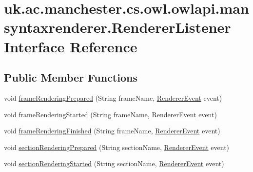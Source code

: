 \hypertarget{interfaceuk_1_1ac_1_1manchester_1_1cs_1_1owl_1_1owlapi_1_1mansyntaxrenderer_1_1_renderer_listener}{\section{uk.\-ac.\-manchester.\-cs.\-owl.\-owlapi.\-mansyntaxrenderer.\-Renderer\-Listener Interface Reference}
\label{interfaceuk_1_1ac_1_1manchester_1_1cs_1_1owl_1_1owlapi_1_1mansyntaxrenderer_1_1_renderer_listener}
}
\subsection*{Public Member Functions}
\begin{DoxyCompactItemize}
\item 
void \hyperlink{interfaceuk_1_1ac_1_1manchester_1_1cs_1_1owl_1_1owlapi_1_1mansyntaxrenderer_1_1_renderer_listener_a1dfb617b0ed1c2310d50a1e9f17dc08f}{frame\-Rendering\-Prepared} (String frame\-Name, \hyperlink{classuk_1_1ac_1_1manchester_1_1cs_1_1owl_1_1owlapi_1_1mansyntaxrenderer_1_1_renderer_event}{Renderer\-Event} event)
\item 
void \hyperlink{interfaceuk_1_1ac_1_1manchester_1_1cs_1_1owl_1_1owlapi_1_1mansyntaxrenderer_1_1_renderer_listener_a4698bfbea7fed76af497126dbd8f71cd}{frame\-Rendering\-Started} (String frame\-Name, \hyperlink{classuk_1_1ac_1_1manchester_1_1cs_1_1owl_1_1owlapi_1_1mansyntaxrenderer_1_1_renderer_event}{Renderer\-Event} event)
\item 
void \hyperlink{interfaceuk_1_1ac_1_1manchester_1_1cs_1_1owl_1_1owlapi_1_1mansyntaxrenderer_1_1_renderer_listener_aacc476efda5b7a3ffba2d98c2809b37f}{frame\-Rendering\-Finished} (String frame\-Name, \hyperlink{classuk_1_1ac_1_1manchester_1_1cs_1_1owl_1_1owlapi_1_1mansyntaxrenderer_1_1_renderer_event}{Renderer\-Event} event)
\item 
void \hyperlink{interfaceuk_1_1ac_1_1manchester_1_1cs_1_1owl_1_1owlapi_1_1mansyntaxrenderer_1_1_renderer_listener_a52bddba9494ba46b6577cf493aaf8a0c}{section\-Rendering\-Prepared} (String section\-Name, \hyperlink{classuk_1_1ac_1_1manchester_1_1cs_1_1owl_1_1owlapi_1_1mansyntaxrenderer_1_1_renderer_event}{Renderer\-Event} event)
\item 
void \hyperlink{interfaceuk_1_1ac_1_1manchester_1_1cs_1_1owl_1_1owlapi_1_1mansyntaxrenderer_1_1_renderer_listener_ac513e07909392b05f4985abad834a48f}{section\-Rendering\-Started} (String section\-Name, \hyperlink{classuk_1_1ac_1_1manchester_1_1cs_1_1owl_1_1owlapi_1_1mansyntaxrenderer_1_1_renderer_event}{Renderer\-Event} event)

\end{DoxyCompactItemize}
